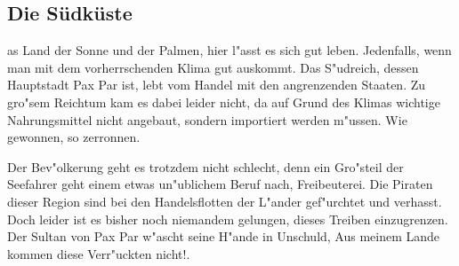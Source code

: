 \subsection{Die Südküste}
as Land der Sonne
und der Palmen, hier l"asst es sich gut leben. Jedenfalls, wenn man
mit dem vorherrschenden Klima gut auskommt. Das S"udreich, dessen
Hauptstadt Pax Par ist, lebt vom Handel mit den
angrenzenden Staaten. Zu gro"sem Reichtum kam es dabei leider nicht,
da auf Grund des Klimas wichtige Nahrungsmittel nicht angebaut,
sondern importiert werden m"ussen. Wie gewonnen, so zerronnen.
\par Der Bev"olkerung geht es trotzdem nicht schlecht, denn ein Gro"steil der
 Seefahrer geht einem etwas un"ublichem Beruf nach, Freibeuterei. Die Piraten dieser 
 Region sind bei den Handelsflotten der L"ander gef"urchtet und verhasst. Doch leider 
 ist es bisher noch niemandem gelungen, dieses Treiben einzugrenzen. Der Sultan von 
 Pax Par w"ascht seine H"ande in Unschuld, \glqq Aus meinem Lande kommen diese Verr"uckten nicht!\grqq.
